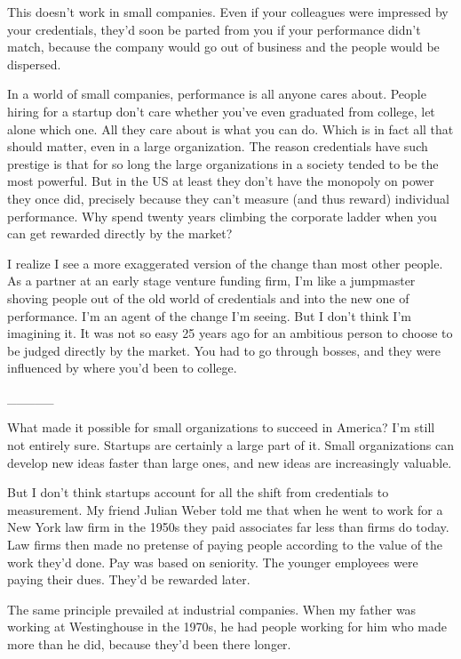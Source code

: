 This doesn't work in small companies. Even if your colleagues were
impressed by your credentials, they'd soon be parted from you if your
performance didn't match, because the company would go out of business
and the people would be dispersed.

In a world of small companies, performance is all anyone cares about.
People hiring for a startup don't care whether you've even graduated
from college, let alone which one. All they care about is what you can
do. Which is in fact all that should matter, even in a large
organization. The reason credentials have such prestige is that for so
long the large organizations in a society tended to be the most
powerful. But in the US at least they don't have the monopoly on power
they once did, precisely because they can't measure (and thus reward)
individual performance. Why spend twenty years climbing the corporate
ladder when you can get rewarded directly by the market?

I realize I see a more exaggerated version of the change than most other
people. As a partner at an early stage venture funding firm, I'm like a
jumpmaster shoving people out of the old world of credentials and into
the new one of performance. I'm an agent of the change I'm seeing. But I
don't think I'm imagining it. It was not so easy 25 years ago for an
ambitious person to choose to be judged directly by the market. You had
to go through bosses, and they were influenced by where you'd been to
college.

\_\_\_\_\_

What made it possible for small organizations to succeed in America? I'm
still not entirely sure. Startups are certainly a large part of it.
Small organizations can develop new ideas faster than large ones, and
new ideas are increasingly valuable.

But I don't think startups account for all the shift from credentials to
measurement. My friend Julian Weber told me that when he went to work
for a New York law firm in the 1950s they paid associates far less than
firms do today. Law firms then made no pretense of paying people
according to the value of the work they'd done. Pay was based on
seniority. The younger employees were paying their dues. They'd be
rewarded later.

The same principle prevailed at industrial companies. When my father was
working at Westinghouse in the 1970s, he had people working for him who
made more than he did, because they'd been there longer.

